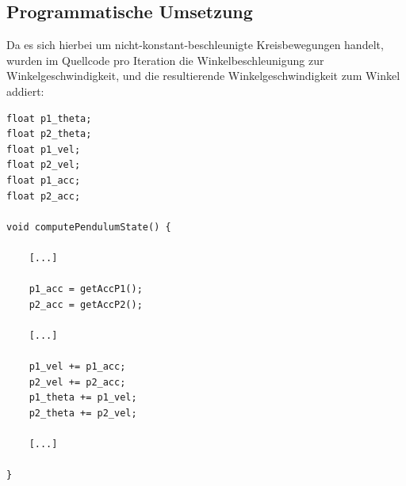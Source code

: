 \documentclass[titlepage, 11pt, a4paper, ngerman]{article}
\begin{document}
\subsection{Programmatische Umsetzung}
Da es sich hierbei um nicht-konstant-beschleunigte Kreisbewegungen handelt, wurden im Quellcode pro Iteration die Winkelbeschleunigung zur Winkelgeschwindigkeit, und die resultierende Winkelgeschwindigkeit zum Winkel addiert:
\begin{verbatim}
float p1_theta;
float p2_theta;
float p1_vel;
float p2_vel;
float p1_acc;
float p2_acc;

void computePendulumState() {
    
    [...]
    
    p1_acc = getAccP1();
    p2_acc = getAccP2();
        
    [...]
        
    p1_vel += p1_acc;
    p2_vel += p2_acc;
    p1_theta += p1_vel;
    p2_theta += p2_vel;
    
    [...]
    
}
\end{verbatim}
\end{document}
